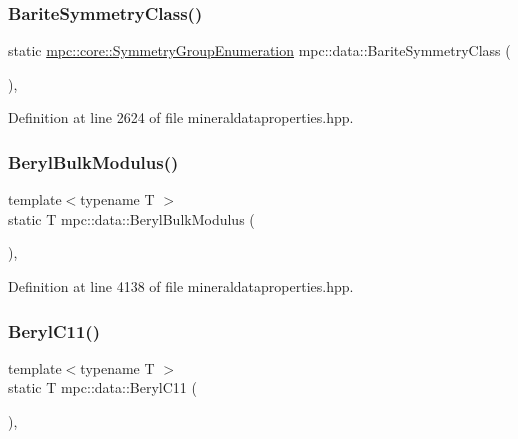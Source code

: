 \subsubsection{\texorpdfstring{Barite\+Symmetry\+Class()}{BariteSymmetryClass()}}
{\footnotesize\ttfamily static \mbox{\hyperlink{namespacempc_1_1core_a9d979684062547055a0ef5c13077bad8}{mpc\+::core\+::\+Symmetry\+Group\+Enumeration}} mpc\+::data\+::\+Barite\+Symmetry\+Class (\begin{DoxyParamCaption}{ }\end{DoxyParamCaption})\hspace{0.3cm}{\ttfamily [inline]}, {\ttfamily [static]}}



Definition at line 2624 of file mineraldataproperties.\+hpp.

\mbox{\label{namespacempc_1_1data_a361eb2d7e1040aba96b8bfa197f3a1e0}} 
\subsubsection{\texorpdfstring{Beryl\+Bulk\+Modulus()}{BerylBulkModulus()}}
{\footnotesize\ttfamily template$<$typename T $>$ \\
static T mpc\+::data\+::\+Beryl\+Bulk\+Modulus (\begin{DoxyParamCaption}{ }\end{DoxyParamCaption})\hspace{0.3cm}{\ttfamily [inline]}, {\ttfamily [static]}}



Definition at line 4138 of file mineraldataproperties.\+hpp.

\mbox{\label{namespacempc_1_1data_afb44b86d6020019ac8e4edbee19f5829}} 
\subsubsection{\texorpdfstring{Beryl\+C11()}{BerylC11()}}
{\footnotesize\ttfamily template$<$typename T $>$ \\
static T mpc\+::data\+::\+Beryl\+C11 (\begin{DoxyParamCaption}{ }\end{DoxyParamCaption})\hspace{0.3cm}{\ttfamily [inline]}, {\ttfamily [static]}}



